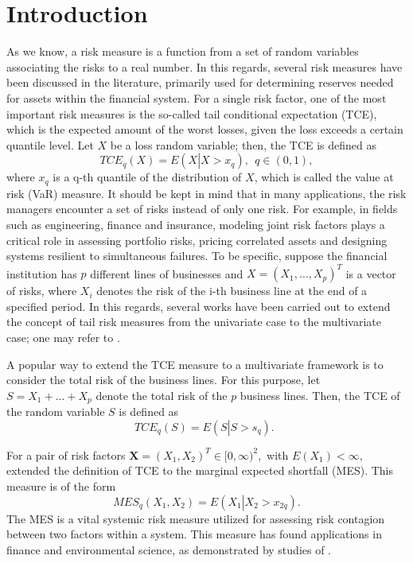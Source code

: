 \documentclass[twoside]{article}
\begin{document}
\section{Introduction}
As we know, a risk measure is a function from a set of random variables
associating the risks to a real number. In this regards, several risk
measures have been discussed in the literature, primarily used for
determining reserves needed for assets within the financial system. For a
single risk factor, one of the most important risk measures is the so-called
tail conditional expectation (TCE), which is the expected amount of the
worst losses, given the loss exceeds a certain quantile level. Let $X$ be a
loss random variable; then, the TCE is defined as%
\begin{equation*}
	TCE_{q}\left( X\right) =E\left( X\left\vert X>x_{q}\right. \right) ,~~q\in
	(0,1),
\end{equation*}%
where $x_{q}$ is a q-th quantile of the distribution of $X$, which is called
the value at risk (VaR) measure. It should be kept in mind that in many
applications, the risk managers encounter a set of risks instead of only one
risk. For example, in fields such as engineering, finance and insurance,
modeling joint risk factors plays a critical role in assessing portfolio
risks, pricing correlated assets and designing systems resilient to
simultaneous failures. To be specific, suppose the financial institution has 
$p$ different lines of businesses and $X=\left( X_{1},...,X_{p}\right) ^{T}$
is a vector of risks, where $X_{i}$ denotes the risk of the i-th business
line at the end of a specified period. In this regards, several works have
been carried out to extend the concept of tail risk measures from the
univariate case to the multivariate case; one may refer to \citet{Abbasi2013,Landsman2016,Roozegar2025}.

A popular way to extend the TCE measure to a multivariate framework is to
consider the total risk of the business lines. For this purpose, let $%
S=X_{1}+...+X_{p}$ denote the total risk of the $p$ business lines. Then,
the TCE of the random variable $S$ is defined as%
\begin{equation*}
	TCE_{q}\left( S\right) =E\left( S\left\vert S>s_{q}\right. \right) .~~
\end{equation*}

For a pair of risk factors $\mathbf{X}=(X_{1},X_{2})^{T}\in \lbrack 0,\infty
)^{2},$ with $E\left( X_{1}\right) <\infty ,$ \citet{Acharya2010} extended
the definition of TCE to the marginal expected shortfall (MES). This measure
is of the form 
\begin{equation*}
	MES_{q}\left( X_{1},X_{2}\right) =E\left( X_{1}\left\vert
	X_{2}>x_{2q}\right. \right) .
\end{equation*}%
The MES is a vital systemic risk measure utilized for assessing risk
contagion between two factors within a system. This measure has found
applications in finance and environmental science, as demonstrated by
studies of \citet{Caporin2012, Brownlees2015}.
\end{document}
